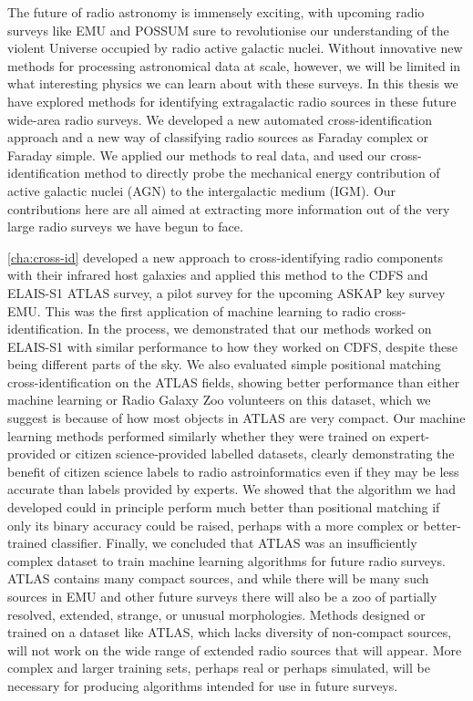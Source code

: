 \documentclass[11pt, a4paper]{book}
\begin{document}
The future of radio astronomy is immensely exciting, with upcoming radio surveys like EMU and POSSUM sure to revolutionise our understanding of the violent Universe occupied by radio active galactic nuclei. Without innovative new methods for processing astronomical data at scale, however, we will be limited in what interesting physics we can learn about with these surveys. In this thesis we have explored methods for identifying extragalactic radio sources in these future wide-area radio surveys. We developed a new automated cross-identification approach and a new way of classifying radio sources as Faraday complex or Faraday simple. We applied our methods to real data, and used our cross-identification method to directly probe the mechanical energy contribution of active galactic nuclei (AGN) to the intergalactic medium (IGM). Our contributions here are all aimed at extracting more information out of the very large radio surveys we have begun to face.

\autoref{cha:cross-id} developed a new approach to cross-identifying radio components with their infrared host galaxies and applied this method to the CDFS and ELAIS-S1 ATLAS survey, a pilot survey for the upcoming ASKAP key survey EMU. This was the first application of machine learning to radio cross-identification. In the process, we demonstrated that our methods worked on ELAIS-S1 with similar performance to how they worked on CDFS, despite these being different parts of the sky. We also evaluated simple positional matching cross-identification on the ATLAS fields, showing better performance than either machine learning or Radio Galaxy Zoo volunteers on this dataset, which we suggest is because of how most objects in ATLAS are very compact. Our machine learning methods performed similarly whether they were trained on expert-provided or citizen science-provided labelled datasets, clearly demonstrating the benefit of citizen science labels to radio astroinformatics even if they may be less accurate than labels provided by experts. We showed that the algorithm we had developed could in principle perform much better than positional matching if only its binary accuracy could be raised, perhaps with a more complex or better-trained classifier. Finally, we concluded that ATLAS was an insufficiently complex dataset to train machine learning algorithms for future radio surveys. ATLAS contains many compact sources, and while there will be many such sources in EMU and other future surveys there will also be a zoo of partially resolved, extended, strange, or unusual morphologies. Methods designed or trained on a dataset like ATLAS, which lacks diversity of non-compact sources, will not work on the wide range of extended radio sources that will appear. More complex and larger training sets, perhaps real or perhaps simulated, will be necessary for producing algorithms intended for use in future surveys.
\end{document}
